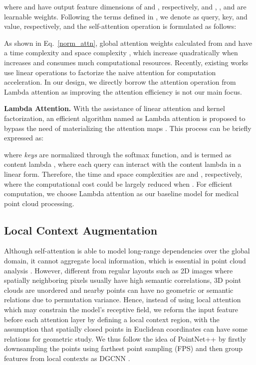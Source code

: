 \documentclass[10pt,twocolumn,letterpaper]{article}
\begin{document}
where  and  have output feature dimensions of  and , respectively, and , , and  are learnable weights.
Following the terms defined in \cite{vaswani2017attention}, we denote  as query, key, and value, respectively, and the self-attention operation is formulated as follows:

As shown in Eq.~\ref{norm_attn}, global attention weights calculated from  and  have a time complexity  and space complexity , which increase quadratically when  increases and consumes much computational resources.
Recently, existing works \cite{performer, lambdanetworks, katharopoulos2020} use linear operations to factorize the naive attention for computation acceleration.
In our design, we directly borrow the attention operation from Lambda attention \cite{lambdanetworks} as improving the attention efficiency is not our main focus.

\noindent \textbf{Lambda Attention.}
With the assistance of linear attention \cite{katharopoulos2020,performer} and kernel factorization, an efficient algorithm named as Lambda attention is proposed to bypass the need of materializing the attention maps \cite{lambdanetworks}. This process can be briefly expressed as:

where \textit{keys} are normalized through the softmax function, and  is termed as content lambda \cite{lambdanetworks}, where each query can interact with the content lambda in a linear form.
Therefore, the time and space complexities are  and , respectively, where the computational cost could be largely reduced when .
For efficient computation, we choose Lambda attention as our baseline model for medical point cloud processing.

\subsection{Local Context Augmentation} \label{neighbor}
Although self-attention is able to model long-range dependencies over the global domain, it cannot aggregate local information, which is essential in point cloud analysis \cite{guo2020pct}.
However, different from regular layouts such as 2D images where spatially neighboring pixels usually have high semantic correlations, 3D point clouds are unordered and nearby points can have no geometric or semantic relations due to permutation variance.
Hence, instead of using local attention \cite{StandAlone} which may constrain the model's receptive field, we reform the input feature before each attention layer by defining a local context region, with the assumption that spatially closed points in Euclidean coordinates can have some relations for geometric study.
We thus follow the idea of PointNet++ \cite{qi2017pointnet2} by firstly downsampling the points using farthest point sampling (FPS) and then group features from local contexts as DGCNN \cite{wang2019dynamic}.
\end{document}
